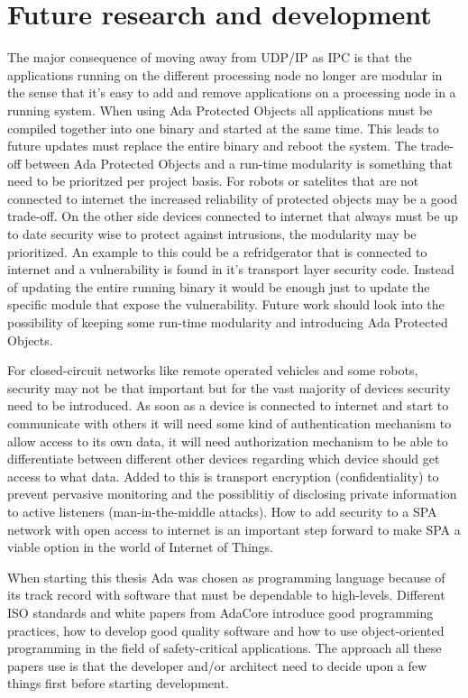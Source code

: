 \section{Future research and development}
The major consequence of moving away from UDP/IP as IPC is that the
applications running on the different processing node no longer are modular in
the sense that it's easy to add and remove applications on a processing node in
a running system. When using Ada Protected Objects all applications must be
compiled together into one binary and started at the same time. This leads to
future updates must replace the entire binary and reboot the system. The
trade-off between Ada Protected Objects and a run-time modularity is something
that need to be prioritzed per project basis. For robots or satelites that are
not connected to internet the increased reliability of protected objects may be
a good trade-off. On the other side devices connected to internet that always
must be up to date security wise to protect against intrusions, the modularity
may be prioritized.  An example to this could be a refridgerator that is
connected to internet and a vulnerability is found in it's transport layer
security code. Instead of updating the entire running binary it would be enough
just to update the specific module that expose the vulnerability. Future work
should look into the possibility of keeping some run-time modularity and
introducing Ada Protected Objects.

For closed-circuit networks like remote operated vehicles and some robots,
security may not be that important but for the vast majority of devices
security need to be introduced. As soon as a device is connected to internet
and start to communicate with others it will need some kind of authentication
mechanism to allow access to its own data, it will need authorization mechanism
to be able to differentiate between different other devices regarding which
device should get access to what data. Added to this is transport encryption
(confidentiality) to prevent pervasive monitoring and the possiblitiy of
disclosing private information to active listeners (man-in-the-middle attacks).
How to add security to a SPA network with open access to internet is an
important step forward to make SPA a viable option in the world of Internet of
Things.

When starting this thesis Ada was chosen as programming language because of its
track record with software that must be dependable to high-levels. Different
ISO standards and white papers from AdaCore introduce good programming
practices, how to develop good quality software and how to use object-oriented
programming in the field of safety-critical applications. The approach all
these papers use is that the developer and/or architect need to decide upon a
few things first before starting development.

